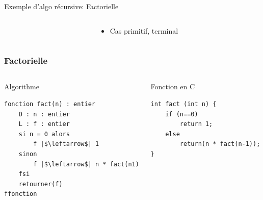 \documentclass[table,handout,tikz,12pt,svgnames]{beamer}
\begin{document}
\begin{frame}[fragile=singleslide]
\begin{block}{}
\begin{itemize}
\begin{block}{Exemple d'algo récursive: Factorielle}
\begin{columns}[c]
\begin{column}{0.55\textwidth}
\begin{itemize}
						\end{itemize}
					\end{column}
					\hspace{-0.3cm}
					\vrule{}
					\hspace{0cm}
					\begin{column}{0.45\textwidth}
						\begin{itemize}
							\item Cas primitif, terminal
						\end{itemize}
				    \end{column}
				\end{columns}
				\end{block}
			\end{itemize}
		\end{block}
\end{frame}

\begin{frame}[fragile=singleslide]
	\frametitle{Factorielle}
				\begin{columns}[T]
				  	\hspace{-0.3cm}
				  	\begin{column}{0.5\textwidth}
				  	\begin{block}{Algorithme}
						\begin{verbatim}
fonction fact(n) : entier
	D : n : entier
	L : f : entier
	si n = 0 alors
		f |$\leftarrow$| 1
	sinon
		f |$\leftarrow$| n * fact(n­1)
	fsi
	retourner(f)
ffonction
						\end{verbatim}
					\end{block}
					\end{column}
					\vrule{}
				  	\begin{column}{0.55\textwidth}
				  	\begin{block}{Fonction en C}
						\begin{verbatim}
int fact (int n) {
	if (n==0)
		return 1;
	else
		return(n * fact(n-1));
}
						\end{verbatim}
					\end{block}
					\end{column}
				\end{columns}
\end{frame}
\end{document}
